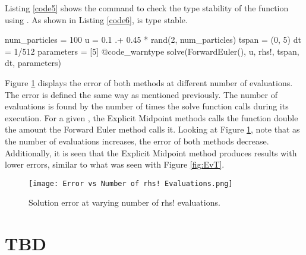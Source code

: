 \documentclass{article}
\begin{document}
Listing \ref{code5} shows the command to check the type stability of the  function using . As shown in Listing \ref{code6},  is type stable.

{\LARGE
\begin{jllisting}[caption={Type stable check command.}, label=code5]
num_particles = 100
u = 0.1 .+ 0.45 * rand(2, num_particles)
tspan = (0, 5)
dt = 1/512
parameters = [5]
@code_warntype solve(ForwardEuler(), u, rhs!, tspan, dt, parameters)
\end{jllisting}
}

{\LARGE
{}
}

Figure \ref{fig:EvN} displays the error of both methods at different number of  evaluations. The error is defined the same way as mentioned previously. The number of  evaluations is found by the number of times the solve function calls  during its execution. For a given , the Explicit Midpoint methods calls the  function double the amount the Forward Euler method calls it. Looking at Figure \ref{fig:EvN}, note that as the number of  evaluations increases, the error of both methods decrease. Additionally, it is seen that the Explicit Midpoint method produces results with lower errors, similar to what was seen with Figure \ref{fig:EvT}.

\begin{figure}[h!]
  \centering
  \texttt{[image: Error vs Number of rhs! Evaluations.png]}
  \caption{Solution error at varying number of rhs! evaluations.}
  \label{fig:EvN}
\end{figure}

\section{TBD}
\end{document}
